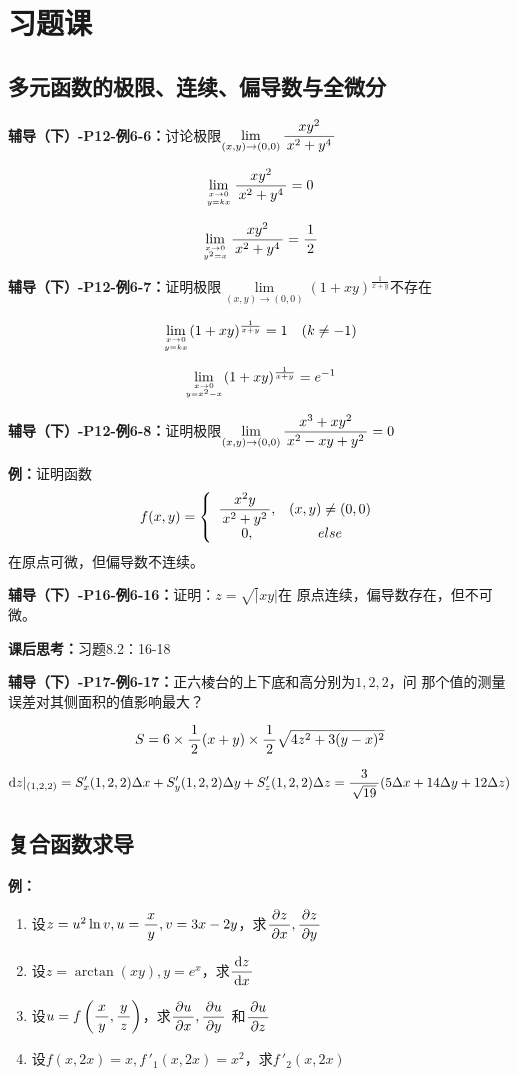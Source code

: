 \newpage

\section*{习题课}

\subsection*{多元函数的极限、连续、偏导数与全微分}

{\bf 辅导（下）-P12-例6-6：}讨论极限$\lim\limits_{(x,y)\to(0,0)}\displaystyle\frac{\,{xy^2}\,}{\,{x^2+y^4}\,}$

$$\lim\limits_{x\to 0\atop{y=kx}}\displaystyle\frac{\,{xy^2}\,}{\,{x^2+y^4}\,}=0$$

$$\lim\limits_{x\to 0\atop{y^2=x}}\displaystyle\frac{\,{xy^2}\,}{\,{x^2+y^4}\,}=\displaystyle\frac{\,{1}\,}{\,{2}\,}$$

{\bf 辅导（下）-P12-例6-7：}证明极限$\lim\limits_{(x,y)\to(0,0)}(1+xy)
^{\frac1{x+y}}$不存在


$$\lim\limits_{x\to 0\atop{y=kx}}(1+xy)^{\frac1{x+y}}=1\quad (k\ne -1)$$

$$\lim\limits_{x\to 0\atop{y=x^2-x}}(1+xy)^{\frac1{x+y}}=e^{-1}$$

{\bf 辅导（下）-P12-例6-8：}证明极限$\lim\limits_{(x,y)\to(0,0)}
\displaystyle\frac{\,{x^3+xy^2}\,}{\,{x^2-xy+y^2}\,}=0$

{\bf 例：}证明函数
  $$f(x,y)=\left\{\begin{array}{cc}
  	\displaystyle\frac{\,{x^2y}\,}{\,{x^2+y^2}\,},& (x,y)\ne (0,0)\\
  	0,& else
  \end{array}\right.$$
  在原点可微，但偏导数不连续。

{\bf 辅导（下）-P16-例6-16：}证明：$z=\sqrt|xy|$在
原点连续，偏导数存在，但不可微。

{\bf 课后思考：}习题8.2：16-18

{\bf 辅导（下）-P17-例6-17：}正六棱台的上下底和高分别为$1,2,2$，问
那个值的测量误差对其侧面积的值影响最大？

$$S=6\times\displaystyle\frac{\,{1}\,}{\,{2}\,}(x+y)\times\displaystyle\frac{\,{1}\,}{\,{2}\,}\sqrt{4z^2+3(y-x)^2}$$

$$\mathrm{d} z|_{(1,2,2)}=S'_x(1,2,2)\Delta x+S'_y(1,2,2)\Delta y+
S'_z(1,2,2)\Delta z=\displaystyle\frac{\,{3}\,}{\,{\sqrt{19}}\,}(5\Delta x+14\Delta y+12\Delta z)$$

\subsection*{复合函数求导}

{\bf 例：}
\begin{enumerate}[(1)]
  \setlength{\itemindent}{1cm}
  \item 设$z=u^2\ln v,u=\displaystyle\frac{\,{x}\,}{\,{y}\,},v=3x-2y$，求$\displaystyle\frac{\,{\partial z}\,}{\,{\partial x}\,},\displaystyle\frac{\,{\partial z}\,}{\,{\partial
  y}\,}$ 
  \item 设$z=\arctan(xy),y=e^x$，求$\displaystyle\frac{\,{\mathrm{d} z}\,}{\,{\mathrm{d} x}\,}$ 
  \item 设$u=f\left(\displaystyle\frac{\,{x}\,}{\,{y}\,},\displaystyle\frac{\,{y}\,}{\,{z}\,}\right)$，求$\displaystyle\frac{\,{\partial u}\,}{\,{\partial x}\,},\displaystyle\frac{\,{\partial u}\,}{\,{\partial y}\,}$
  和$\displaystyle\frac{\,{\partial u}\,}{\,{\partial z}\,}$ 
  \item 设$f(x,2x)=x,f\,'_1(x,2x)=x^2$，求$f\,'_2(x,2x)$
\end{enumerate}

